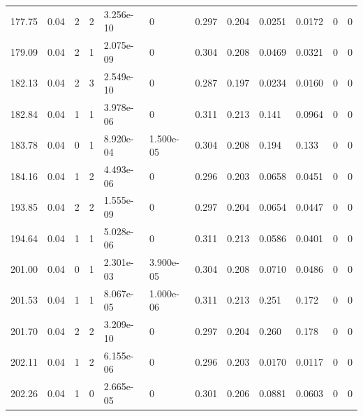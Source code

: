 \documentclass[preview]{standalone}
\begin{document}
{{{\begin{tabular}{L{1.2cm}C{1.2cm} C{0.3cm}C{0.5cm} C{1.4cm}C{1.4cm} C{1.4cm}C{1.4cm} C{1.6cm}C{1.6cm} C{1.6cm}C{1.6cm}}
  177.75  &  0.04  & 2     &  2 &  3.256e-10  & 0  &  0.297&   0.204& 0.0251 & 0.0172   &  0 & 0  \\ 
  179.09  &  0.04  & 2     &  1 &  2.075e-09  & 0  &  0.304&   0.208& 0.0469 & 0.0321   &  0 & 0  \\ 
  182.13  &  0.04  & 2     &  3 &  2.549e-10  & 0  &  0.287&   0.197& 0.0234 & 0.0160   &  0 & 0  \\ 
  182.84  &  0.04  & 1     &  1 &  3.978e-06  & 0  &  0.311&   0.213& 0.141 & 0.0964   &  0 & 0  \\ 
  183.78  &  0.04  & 0     &  1 &  8.920e-04  & 1.500e-05  &  0.304&   0.208& 0.194 & 0.133   &  0 & 0  \\ 
  184.16  &  0.04  & 1     &  2 &  4.493e-06  & 0  &  0.296&   0.203& 0.0658 & 0.0451   &  0 & 0  \\ 
  193.85  &  0.04  & 2     &  2 &  1.555e-09  & 0  &  0.297&   0.204& 0.0654 & 0.0447   &  0 & 0  \\ 
  194.64  &  0.04  & 1     &  1 &  5.028e-06  & 0  &  0.311&   0.213& 0.0586 & 0.0401   &  0 & 0  \\ 
  201.00  &  0.04  & 0     &  1 &  2.301e-03  & 3.900e-05  &  0.304&   0.208& 0.0710 & 0.0486   &  0 & 0  \\ 
  201.53  &  0.04  & 1     &  1 &  8.067e-05  & 1.000e-06  &  0.311&   0.213& 0.251 & 0.172   &  0 & 0  \\ 
  201.70  &  0.04  & 2     &  2 &  3.209e-10  & 0  &  0.297&   0.204& 0.260 & 0.178   &  0 & 0  \\ 
  202.11  &  0.04  & 1     &  2 &  6.155e-06  & 0  &  0.296&   0.203& 0.0170 & 0.0117   &  0 & 0  \\ 
  202.26  &  0.04  & 1     &  0 &  2.665e-05  & 0  &  0.301&   0.206& 0.0881 & 0.0603   &  0 & 0  \\ 
\hline 
\end{tabular} 

}}}
\end{document}
